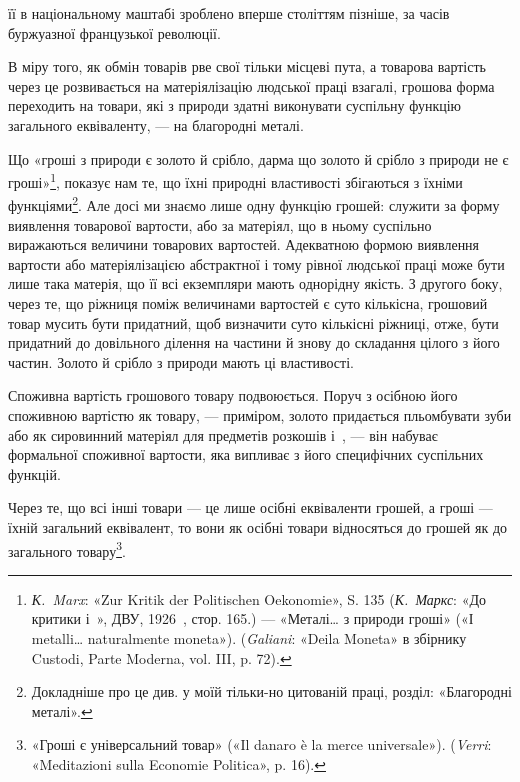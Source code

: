 \parcont{}  %
її в національному маштабі зроблено вперше століттям пізніше,
за часів буржуазної французької революції.

В міру того, як обмін товарів рве свої тільки місцеві пута,
а товарова вартість через це розвивається на матеріялізацію
людської праці взагалі, грошова форма переходить на товари,
які з природи здатні виконувати суспільну функцію загального
еквіваленту, — на благородні металі.

Що «гроші з природи є золото й срібло, дарма що золото й
срібло з природи не є гроші»\footnote{
\emph{К.~Marx}: «Zur Kritik der Politischen Oekonomie», S. 135 (\emph{К.~Маркс}:
«До критики і~», ДВУ, 1926~, стор. 165.) — «Металі\dots{} з природи
гроші» («І metalli\dots{} naturalmente moneta»). (\emph{Galiani}: «Deila Moneta»
в збірнику Custodi, Parte Moderna, vol. III, p. 72).
}, показує нам те, що їхні природні
властивості збігаються з їхніми функціями\footnote{
Докладніше про це див. у моїй тільки-но цитованій праці, розділ:
«Благородні металі».
}. Але досі
ми знаємо лише одну функцію грошей: служити за форму виявлення
товарової вартости, або за матеріял, що в ньому суспільно
виражаються величини товарових вартостей. Адекватною формою
виявлення вартости або матеріялізацією абстрактної і тому рівної
людської праці може бути лише така матерія, що її всі екземпляри
мають однорідну якість. З другого боку, через те, що ріжниця
поміж величинами вартостей є суто кількісна, грошовий товар
мусить бути придатний, щоб визначити суто кількісні ріжниці,
отже, бути придатний до довільного ділення на частини й знову
до складання цілого з його частин. Золото й срібло з природи
мають ці властивості.

Споживна вартість грошового товару подвоюється. Поруч з
осібною його споживною вартістю як товару, — приміром, золото
придається пльомбувати зуби або як сировинний матеріял
для предметів розкошів і~, — він набуває формальної споживної
вартости, яка випливає з його специфічних суспільних
функцій.

Через те, що всі інші товари — це лише осібні еквіваленти
грошей, а гроші — їхній загальний еквівалент, то вони як осібні
товари відносяться до грошей як до загального товару\footnote{
«Гроші є універсальний товар» («Il danaro è la merce universale»).
(\emph{Verri}: «Meditazioni sulla Economie Politica», p. 16).
}.

